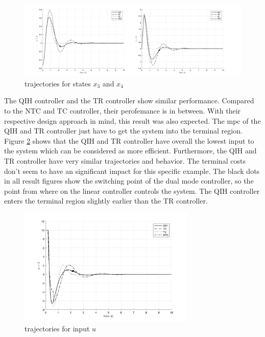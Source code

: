 \documentclass[10pt,a4paper,titlepage]{article}
\begin{document}
\begin{figure}[h!]
	\begin{center}
		\includegraphics[width=\textwidth]{img/bb_time_x3x4.png}
		\caption{trajectories for states $x_3$ and $x_4$}
		\label{pic:bb_time_x3x4}
	\end{center}
\end{figure}

The QIH controller and the TR controller show similar performance. Compared to the NTC and TC controller, their perofemance is in between. With their respective 
design approach in mind, this result was also expected. The \gls{mpc} of the QIH and TR controller just have to get the system into the terminal region.
Figure \ref{pic:bb_time_u} shows that the QIH and TR controller have overall the lowest input to the system which can be considered as more efficient. 
Furthermore, the QIH and TR controller have very similar
trajectories and behavior. The terminal costs don't seem to have an significant impact for this specific example. The black dots in all result figures show the
switching point of the dual mode controller, so the point from where on the linear controller controls the system. The QIH controller enters the terminal region
slightly earlier than the TR controller. 

\begin{figure}[h!]
	\begin{center}
		\includegraphics[width=0.75\textwidth]{img/bb_time_u.png}
		\caption{trajectories for input $u$}
		\label{pic:bb_time_u}
	\end{center}
\end{figure}
\end{document}
